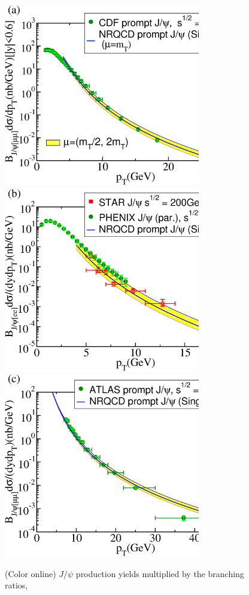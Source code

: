 \documentclass[article,showpacs,preprintnumbers,amsmath,amssymb]{revtex4}
\begin{document}
\begin{figure}[!ht]
\vspace*{.2in} 
\includegraphics[width=3.38in,angle=0]{fig1_cdf1960pp.eps} 
\includegraphics[width=3.38in,angle=0]{fig2_rhic0200pp.eps} 
\includegraphics[width=3.38in,angle=0]{fig3_lhc7000pp.eps} 
\caption{(Color online) $J/\psi$ production yields multiplied by the branching ratios,
}
\end{figure}
\end{document}

